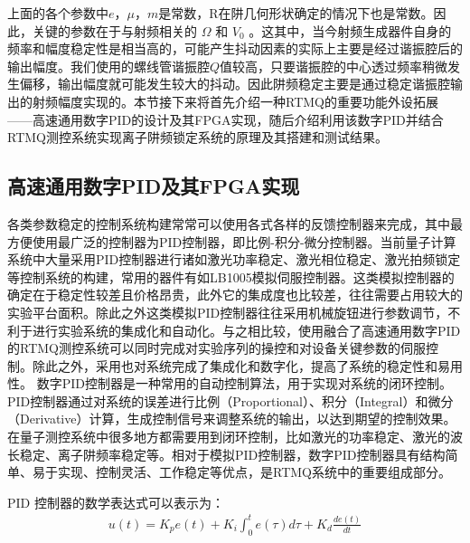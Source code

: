 上面的各个参数中$e$，$\mu$，$m$是常数，R在阱几何形状确定的情况下也是常数。因此，关键的参数在于与射频相关的 $\Omega$ 和 $V_0$ 。这其中，当今射频生成器件自身的频率和幅度稳定性是相当高的，可能产生抖动因素的实际上主要是经过谐振腔后的输出幅度。我们使用的螺线管谐振腔$Q$值较高，只要谐振腔的中心透过频率稍微发生偏移，输出幅度就可能发生较大的抖动。因此阱频稳定主要是通过稳定谐振腔输出的射频幅度实现的。本节接下来将首先介绍一种RTMQ的重要功能外设拓展——高速通用数字PID的设计及其FPGA实现，随后介绍利用该数字PID并结合RTMQ测控系统实现离子阱频锁定系统的原理及其搭建和测试结果。

\subsection[高速通用数字PID及其FPGA实现]{高速通用数字PID及其FPGA实现\label{section:digital_pid}}

各类参数稳定的控制系统构建常常可以使用各式各样的反馈控制器来完成，其中最方便使用最广泛的控制器为PID控制器，即比例-积分-微分控制器。当前量子计算系统中大量采用PID控制器进行诸如激光功率稳定、激光相位稳定、激光拍频锁定等控制系统的构建，常用的器件有如LB1005模拟伺服控制器。这类模拟控制器的确定在于稳定性较差且价格昂贵，此外它的集成度也比较差，往往需要占用较大的实验平台面积。除此之外这类模拟PID控制器往往采用机械旋钮进行参数调节，不利于进行实验系统的集成化和自动化。与之相比较，使用融合了高速通用数字PID的RTMQ测控系统可以同时完成对实验序列的操控和对设备关键参数的伺服控制。除此之外，采用也对系统完成了集成化和数字化，提高了系统的稳定性和易用性。
数字PID控制器是一种常用的自动控制算法，用于实现对系统的闭环控制。PID控制器通过对系统的误差进行比例（Proportional）、积分（Integral）和微分（Derivative）计算，生成控制信号来调整系统的输出，以达到期望的控制效果。在量子测控系统中很多地方都需要用到闭环控制，比如激光的功率稳定、激光的波长稳定、离子阱频率稳定等。相对于模拟PID控制器，数字PID控制器具有结构简单、易于实现、控制灵活、工作稳定等优点，是RTMQ系统中的重要组成部分。

PID 控制器的数学表达式可以表示为：
\begin{align}
    u(t)= K_p e(t) + K_i \int_{0}^{t} e(\tau) d\tau + K_d \frac{d e(t)}{dt}
\end{align}

